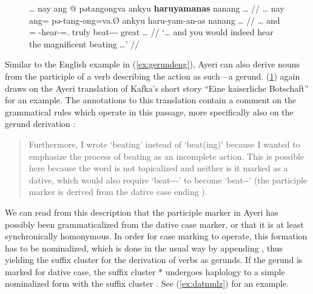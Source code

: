 \begin{figure}[h]
\ex\label{ex:kafkagerund}\begingl
	\gla … nay ang @ pətangongva ankyu \textbf{haruyamanas} nanang … //
	\glb … nay ang= pə-tang-ong=va.Ø ankyu haru-yam-an-as nanang … //
	\glc … and \AgtT{}= \NFut{}-hear-\Irr{}=\Second{}.\Top{} truly 
		beat-\Ptcp{}-\Nmlz{}-\Parg{} great … // %
	\glft `… and you would indeed hear the magnificent beating …' //
\endgl\xe
\end{figure}

Similar to the English example in (\ref{ex:gerundeng}), Ayeri can also derive
nouns from the participle of a verb describing the action as such---a gerund.
(\ref{ex:kafkagerund}) again draws on the Ayeri translation of Kafka's short
story \enquote{Eine kaiserliche Botschaft} \citep[2, 14]{becker:kafka:imperial}
for an example. The annotations to this translation contain a comment on the
grammatical rules which operate in this passage, more specifically also on the
gerund derivation :

\blockcquote[14--15]{becker:kafka:imperial}{Furthermore, I wrote
 `beating' instead of  `beat(ing)' because I wanted to
emphasize the process of beating as an incomplete action. This is possible here
because the word is not topicalized and neither is it marked as a dative, which
would also require  `beat-\Ptcp{}-\Nmlz{}-\Dat{}' to become
 `beat-\Nmlz{}-\Dat{}' (the participle marker  is 
derived from the dative case ending ).}

We can read from this description that the participle marker in Ayeri has
possibly been grammaticalized from the dative case marker, or that it is at
least synchronically homonymous. In order for case marking to operate, this
formation has to be nominalized, which is done in the usual way by appending
, thus yielding the suffix cluster  for the
derivation of verbs as gerunds. If the gerund is marked for dative case, the
suffix cluster * undergoes haplology to a
simple nominalized form with the suffix cluster . See
(\ref{ex:datnmlz}) for an example.


